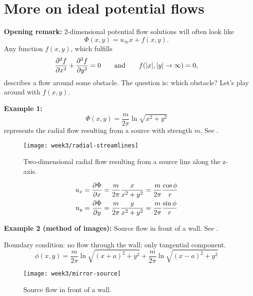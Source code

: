 \section{More on ideal potential flows}
\begin{framed}
\textbf{Opening remark:} 2-dimensional potential flow solutions will often look like
\begin{equation}
\Phi(x,y) = u_\infty x + f(x,y).
\end{equation}
Any function $f(x,y)$, which fulfills
\begin{equation}
\frac{\partial^2 f}{\partial x^2}+\frac{\partial^2 f}{\partial y^2}=0 \qquad \mathrm{and}\qquad f(|x|,|y|\rightarrow\infty) = 0,
\end{equation}
describes a flow around some obstacle. The question is: which obstacle? Let's play around with $f(x,y)$.
\end{framed}

\textbf{Example 1:}
\begin{equation}
\Phi(x,y)=\frac{m}{2\pi} \ln \sqrt{x^2+y^2}
\end{equation}
represents the radial flow resulting from a source with strength $m$. See .
\begin{figure}[!h]
    \centering
    \texttt{[image: week3/radial-streamlines]}\\
    \caption{Two-dimensional radial flow resulting from a source line along the z-axis.}
    \label{fig:radial-streamlines}
\end{figure}
\begin{align}
u_x &= \frac{\partial \Phi}{\partial x} = \frac{m}{2\pi}\frac{x}{x^2+y^2}=\frac{m}{2\pi}\frac{\cos\phi}{r}\\
u_y &= \frac{\partial \Phi}{\partial y} = \frac{m}{2\pi}\frac{y}{x^2+y^2}=\frac{m}{2\pi}\frac{\sin\phi}{r}
\end{align}

\textbf{Example 2 (method of images):} Source flow in front of a wall. See .

Boundary condition: no flow through the wall; only tangential component.
\begin{equation}
\phi(x,y) = \frac{m}{2\pi}\ln\sqrt{(x+a)^2+y^2} + \frac{m}{2\pi}\ln\sqrt{(x-a)^2+y^2}
\end{equation}
\begin{figure}[!h]
    \centering
    \texttt{[image: week3/mirror-source]}
    \caption{Source flow in front of a wall.}
    \label{fig:mirror-source}
\end{figure}

